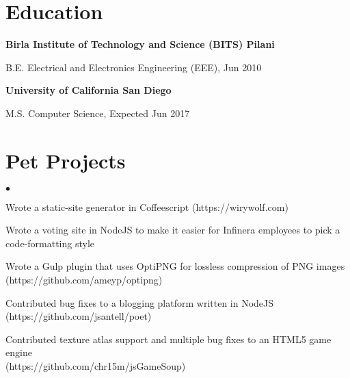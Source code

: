 \documentclass[margin,line]{res}
\newenvironment{list1}{
  \begin{list}{\ding{113}}{%
      \setlength{\itemsep}{0in}
      \setlength{\parsep}{0in} \setlength{\parskip}{0in}
      \setlength{\topsep}{0in} \setlength{\partopsep}{0in}
      \setlength{\leftmargin}{0.17in}}}{\end{list}}
\newenvironment{list2}{
  \begin{list}{$\bullet$}{%
      \setlength{\itemsep}{0in}
      \setlength{\parsep}{0in} \setlength{\parskip}{0in}
      \setlength{\topsep}{0in} \setlength{\partopsep}{0in}
      \setlength{\leftmargin}{0.2in}}}{\end{list}}
\begin{document}
\begin{resume}
\section{\sc Education}
{\bf Birla Institute of Technology and Science (BITS) Pilani} \\
\vspace*{-.1in}
\begin{list1}
\item[] B.E. Electrical and Electronics Engineering (EEE), Jun 2010
\end{list1}

{\bf University of California San Diego} \\
\vspace*{-.1in}
\begin{list1}
\item[] M.S. Computer Science, Expected Jun 2017
\end{list1}

\section{\sc Pet Projects}
\begin{list2}
  \item Wrote a static-site generator in Coffeescript (https://wirywolf.com)
  \item Wrote a voting site in NodeJS to make it easier for Infinera employees to pick a code-formatting style
  \item Wrote a Gulp plugin that uses OptiPNG for lossless compression of PNG images \\ (https://github.com/ameyp/optipng)
  \item Contributed bug fixes to a blogging platform written in NodeJS \- (https://github.com/jsantell/poet)
  \item Contributed texture atlas support and multiple bug fixes to an HTML5 game engine \\ (https://github.com/chr15m/jsGameSoup)
\end{list2}

\end{resume}
\end{document}
